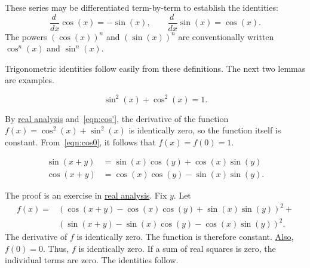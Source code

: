 These series may be differentiated term-by-term to establish the
identities: %
\begin{equation}\label{eqn:cos'}
\frac{d\phantom{~}} {dx}\cos(x) 
= -\sin(x),\qquad \frac{ d\phantom{~} }{dx}\sin(x) = \cos(x).
\end{equation}
%
The powers $(\cos(x))^n$ and $(\sin(x))^n$ are conventionally written
$\cos^n(x)$ and $\sin^n(x)$.

Trigonometric identities follow easily from these definitions.  The
next two lemmas are examples.  %

\begin{lemma}[]
\label{lemma:circle} 
\begin{displaymath}
\sin^2(x) + \cos^2(x) = 1.
\end{displaymath}
\end{lemma}
%

\begin{proved}
  By \hyperref[back:analysis]{real analysis} and~\eqref{eqn:cos'}, the
  derivative of the function $f(x) = \cos^2(x) +\sin^2(x)$ is
  identically zero, so the function itself is constant.
  From~\eqref{eqn:cos0}, it follows that $f(x)=f(0)=1$.
  \swallowed\end{proved}


\begin{lemma}[]\label{lemma:sin-add}
\begin{displaymath}\begin{array}{lll}
\sin(x+y) &= \sin(x)\cos(y) + \cos(x)\sin(y)\\
\cos(x+y)  &= \cos(x)\cos(y) - \sin(x)\sin(y).
\end{array}\end{displaymath}
\end{lemma}
%

\begin{proved}
The proof is an exercise in \hyperref[back:analysis]{real analysis}.
Fix $y$.  Let
\begin{displaymath}\begin{array}{lll}
f(x) = &(\cos(x+y) - \cos(x)\cos(y) +
\sin(x)\sin(y))^2 +\\ & (\sin(x+y) -\sin(x)\cos(y) -
\cos(x)\sin(y))^2.
\end{array}\end{displaymath}
The derivative of $f$ is identically zero.  The function is therefore
constant.  \hyperref[eqn:cos0]{Also}, $f(0)=0$.  Thus, $f$ is
identically zero.  If a sum of real squares is zero, the individual
terms are zero. The identities follow.  \swallowed\end{proved}

